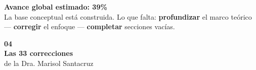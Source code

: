 \documentclass[11pt, aspectratio=169, spanish]{beamer}
\newcommand{\kwM}[1]{{\setlength{\fboxsep}{1.8pt}\colorbox{VerdeUNAL!18}{#1}}}       %
\begin{document}
\begin{frame}[plain]
\begin{center}
\begin{tikzpicture}
\end{tikzpicture}
\end{center}

\vspace{0.1cm}
\begin{center}
\begin{tcolorbox}[colback=VerdeUNAL!7, colframe=VerdeUNAL!65, arc=2mm, width=0.72\textwidth]
\centering
{\small\textbf{\faInfoCircle\quad Avance global estimado: 39\%}}\\[0.04cm]
{\scriptsize La \kwM{base conceptual} está construida. Lo que falta: \textbf{profundizar} el \kwM{marco teórico} — \textbf{corregir} el enfoque — \textbf{completar} secciones vacías.}
\end{tcolorbox}
\end{center}

\end{frame}

\begin{frame}[plain]
\vspace*{1.0cm}
\begin{center}
{\fontsize{40}{48}\selectfont\textcolor{VerdeUNAL!40}{\textbf{04}}}\\[-0.1cm]
{\Large\textbf{Las 33 correcciones}}\\[0.05cm]
{\normalsize\textcolor{GrisClaro!80!black}{de la Dra. Marisol Santacruz}}
\end{center}
\end{frame}
\end{document}
